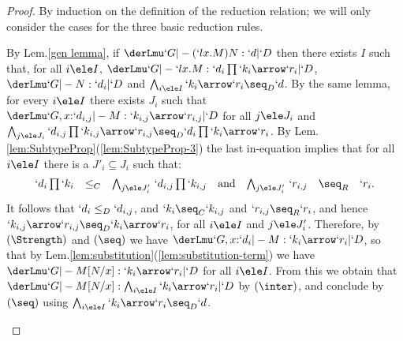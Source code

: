\documentclass{CSML}
\begin{document}
 \begin{proof} %
By induction on the definition of the reduction relation; we will only consider the cases for the three basic reduction rules.

 \begin{description} \itemsep 2pt

 \item [{$(`l x . M ) N \red M [ N /x ] $}] 
By Lem.\skp\ref{gen lemma}, if $\derLmu `G |- {(`l x . M ) N} : `d | `D $ then there exists $I$ such that, for all $i\ele I$, $\derLmu `G |- {`l x . M} : `d_i\prod `k_i\arrow `r_i | `D $, $\derLmu `G |- N : `d_i | `D $ and $\bigwedge_{i\ele I} `k_i\arrow `r_i \seq_D `d$. 
By the same lemma, for every $i \ele I$ there exists $J_i$ such that $\derLmu `G, x{:} `d_{i,j} |- M : `k_{i,j}\arrow `r_{i,j} | `D $ for all $j\ele J_i$ and $\bigwedge_{j\ele J_i} `d_{i,j}\prod `k_{i,j}\arrow `r_{i,j} \seq_D `d_i\prod `k_i\arrow `r_i $.
By Lem.\skp\ref{lem:SubtypeProp}\skp(\ref{lem:SubtypeProp-3}) the last in-equation implies that for all $i\ele I$ there is a $J'_i \subseteq J_i$ such that:
 \[ \begin{array}{rcl@{\quad}c@{\quad}rcl}
`d_i\prod `k_i &\leq_C& \bigwedge_{j\ele J'_i}\,`d_{i,j}\prod `k_{i,j} 
	&\textrm{and}&
\bigwedge_{j\ele J'_i}\,`r_{i,j} &\seq_R& `r_i.
 \end{array} \]
It follows that $`d_i \leq_D `d_{i,j}$, and $ `k_i \seq_C `k_{i,j}$ and $`r_{i,j} \seq_R `r_i$, and hence $`k_{i,j}\arrow `r_{i,j} \seq_D `k_i\arrow `r_i$, for all $i\ele I$ and $j\ele J'_i$.
Therefore, by $(\Strength)$ and $(\seq)$ we have $\derLmu `G, x{:} `d_i |- {M} : `k_i\arrow `r_i | `D $, so that by Lem.\skp\ref{lem:substitution}\skp(\ref{lem:substitution-term}) we have $\derLmu `G |- {M[N/x]} : `k_i\arrow `r_i | `D $ for all $i\ele I$.
From this we obtain that $\derLmu `G |- {M[N/x]} : \bigwedge_{i\ele I} `k_i\arrow `r_i | `D $ by $(\inter)$, and conclude by $(\seq)$ using $\bigwedge_{i\ele I} `k_i\arrow `r_i \seq_D `d$.



\end{description}
\end{proof}
\end{document}
